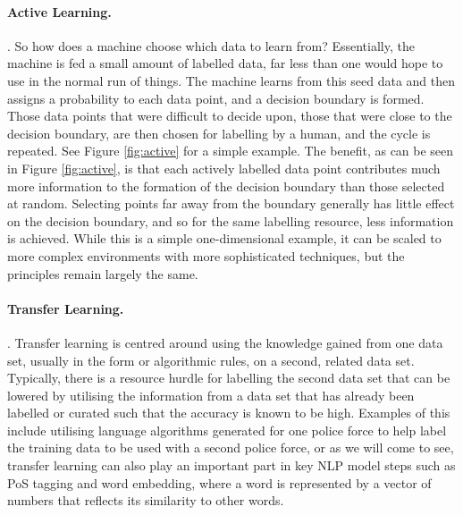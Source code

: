 \paragraph{Active Learning.}   \parencite{settles2009active}. So how does a machine choose which data to learn from? Essentially, the machine is fed a small amount of labelled data, far less than one would hope to use in the normal run of things. The machine learns from this seed data and then assigns a probability to each data point, and a decision boundary is formed. Those data points that were difficult to decide upon, those that were close to the decision boundary, are then chosen for labelling by a human, and the cycle is repeated. See Figure \ref{fig:active} for a simple example. The benefit, as can be seen in Figure \ref{fig:active}, is that each actively labelled data point contributes much more information to the formation of the decision boundary than those selected at random. Selecting points far away from the boundary generally has little effect on the decision boundary, and so for the same labelling resource, less information is achieved. While this is a simple one-dimensional example, it can be scaled to more complex environments with more sophisticated techniques, but the principles remain largely the same.

\paragraph{Transfer Learning.}  \parencite{weiss2016survey,}. Transfer learning is centred around using the knowledge gained from one data set, usually in the form or algorithmic rules, on a second, related data set. Typically, there is a resource hurdle for labelling the second data set that can be lowered by utilising the information from a data set that has already been labelled or curated such that the accuracy is known to be high. Examples of this include utilising language algorithms generated for one police force to help label the training data to be used with a second police force, or as we will come to see, transfer learning can also play an important part in key NLP model steps such as PoS tagging and word embedding, where a word is represented by a vector of numbers that reflects its similarity to other words.


